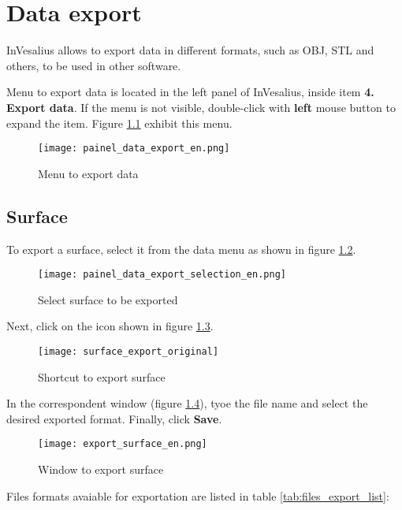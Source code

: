 \chapter{Data export}

InVesalius allows to export data in different formats, such as OBJ, STL and others, to be used in other software.

Menu to export data is located in the left panel of InVesalius,
inside item \textbf{4. Export data}. If the menu is not visible, double-click with \textbf{left} mouse button
to expand the item. Figure \ref{fig:data_export} exhibit this menu.

\begin{figure}[!htb]
\centering
\texttt{[image: painel\_data\_export\_en.png]}
\caption{Menu to export data}
\label{fig:data_export}
\end{figure}

\section{Surface}

To export a surface, select it from the data menu as shown in
figure \ref{fig:data_export_selection}.

\newpage

\begin{figure}[!htb]
\centering
\texttt{[image: painel\_data\_export\_selection\_en.png]}
\caption{Select surface to be exported}
\label{fig:data_export_selection}
\end{figure}

Next, click on the icon shown in figure \ref{fig:surface_export_original}.

\begin{figure}[!htb]
\centering
\texttt{[image: surface\_export\_original]}
\caption{Shortcut to export surface}
\label{fig:surface_export_original}
\end{figure}

In the correspondent window (figure \ref{fig:export_data_window}), tyoe the file name and
select the desired exported format. Finally, click \textbf{Save}.


\begin{figure}[!htb]
\centering
\texttt{[image: export\_surface\_en.png]}
\caption{Window to export surface}
\label{fig:export_data_window}
\end{figure}

Files formats avaiable for exportation are listed in table
\ref{tab:files_export_list}:


